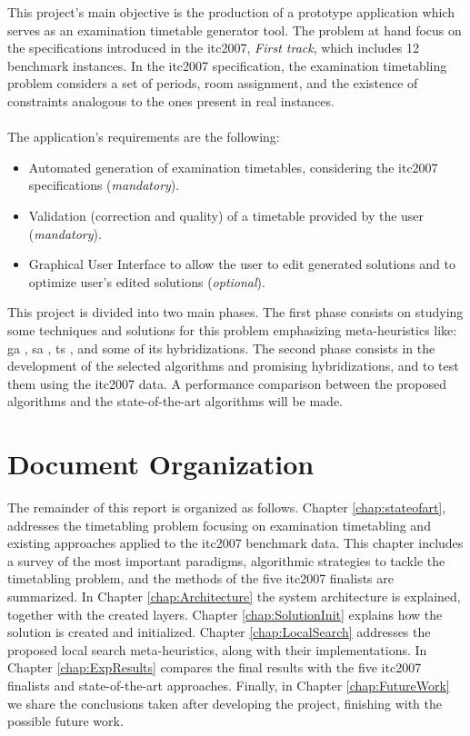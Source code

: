 This project's main objective is the production of a prototype application which serves as an examination timetable generator tool. The problem at hand focus on the specifications introduced in the \gls{itc2007}, \textit{First track}, which includes 12 benchmark instances. In the \gls{itc2007} specification, the examination timetabling problem considers a set of periods, room assignment, and the existence of constraints analogous to the ones present in real instances.\\
\\
The application's requirements are the following:
\begin{itemize}
	\item Automated generation of examination timetables, considering the \gls{itc2007} specifications (\textit{mandatory}).
	\item Validation (correction and quality) of a timetable provided by the user (\textit{mandatory}).
	\item Graphical User Interface to allow the user to edit generated solutions and to optimize user's edited solutions (\textit{optional}).
\end{itemize}
This project is divided into two main phases. The first phase consists on studying some techniques and solutions for this problem emphasizing meta-heuristics like: \gls{ga} \cite{Abdullah2012}, \gls{sa} \cite{Kirkpatrick1983}, \gls{ts} \cite{Smet2007}, and some of its hybridizations. The second phase consists in the development of the selected algorithms and promising hybridizations, and to test them using the \gls{itc2007} data. A performance comparison between the proposed algorithms and the state-of-the-art algorithms will be made.

\section{Document Organization}

The remainder of this report is organized as follows. Chapter \ref{chap:stateofart}, addresses the timetabling problem focusing on examination timetabling and existing approaches applied to the \gls{itc2007} benchmark data. This chapter includes a survey of the most important paradigms, algorithmic strategies to tackle the timetabling problem, and the methods of the five \gls{itc2007} finalists are summarized. In Chapter \ref{chap:Architecture} the system architecture is explained, together with the created layers. Chapter \ref{chap:SolutionInit} explains how the solution is created and initialized. Chapter \ref{chap:LocalSearch} addresses the proposed local search meta-heuristics, along with their implementations. In Chapter \ref{chap:ExpResults} compares the final results with the five \gls{itc2007} finalists and state-of-the-art approaches. Finally, in Chapter \ref{chap:FutureWork} we share the conclusions taken after developing the project, finishing with the possible future work.
